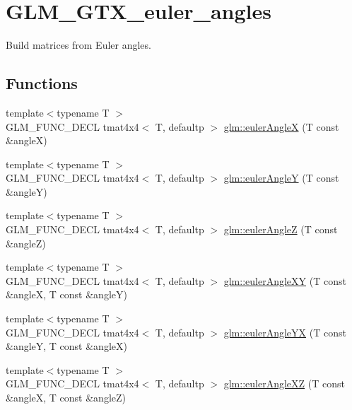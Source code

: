 \hypertarget{group__gtx__euler__angles}{}\section{G\+L\+M\+\_\+\+G\+T\+X\+\_\+euler\+\_\+angles}
\label{group__gtx__euler__angles}


Build matrices from Euler angles.  


\subsection*{Functions}
\begin{DoxyCompactItemize}
\item 
{\footnotesize template$<$typename T $>$ }\\G\+L\+M\+\_\+\+F\+U\+N\+C\+\_\+\+D\+E\+C\+L tmat4x4$<$ T, defaultp $>$ \hyperlink{group__gtx__euler__angles_ga82cd3b8a04943f1a0d1a562aff358dc8}{glm\+::euler\+Angle\+X} (T const \&angle\+X)
\item 
{\footnotesize template$<$typename T $>$ }\\G\+L\+M\+\_\+\+F\+U\+N\+C\+\_\+\+D\+E\+C\+L tmat4x4$<$ T, defaultp $>$ \hyperlink{group__gtx__euler__angles_gaeb193af1184bdf39c23636d756e1ff33}{glm\+::euler\+Angle\+Y} (T const \&angle\+Y)
\item 
{\footnotesize template$<$typename T $>$ }\\G\+L\+M\+\_\+\+F\+U\+N\+C\+\_\+\+D\+E\+C\+L tmat4x4$<$ T, defaultp $>$ \hyperlink{group__gtx__euler__angles_gab59c4fe7f735568255cc19fddd3ddfcd}{glm\+::euler\+Angle\+Z} (T const \&angle\+Z)
\item 
{\footnotesize template$<$typename T $>$ }\\G\+L\+M\+\_\+\+F\+U\+N\+C\+\_\+\+D\+E\+C\+L tmat4x4$<$ T, defaultp $>$ \hyperlink{group__gtx__euler__angles_ga8bf84f92ca976a7f50dbe4b30ceb72dd}{glm\+::euler\+Angle\+X\+Y} (T const \&angle\+X, T const \&angle\+Y)
\item 
{\footnotesize template$<$typename T $>$ }\\G\+L\+M\+\_\+\+F\+U\+N\+C\+\_\+\+D\+E\+C\+L tmat4x4$<$ T, defaultp $>$ \hyperlink{group__gtx__euler__angles_gafdd02f9a37511190962119adef5c1c25}{glm\+::euler\+Angle\+Y\+X} (T const \&angle\+Y, T const \&angle\+X)
\item 
{\footnotesize template$<$typename T $>$ }\\G\+L\+M\+\_\+\+F\+U\+N\+C\+\_\+\+D\+E\+C\+L tmat4x4$<$ T, defaultp $>$ \hyperlink{group__gtx__euler__angles_gab2d7dc94b9a7519d741aaa208c7a335b}{glm\+::euler\+Angle\+X\+Z} (T const \&angle\+X, T const \&angle\+Z)

\end{DoxyCompactItemize}
